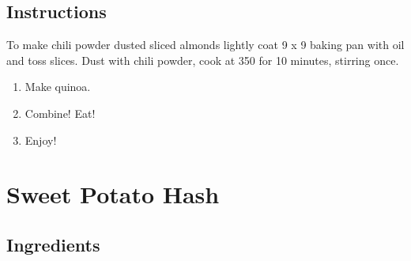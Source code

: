 \documentclass[ansiapaper,10pt,english]{sphinxmanual}
\begin{document}
\section{Instructions}
\label{\detokenize{SA_Quinoa_Salad:instructions}}
To make chili powder dusted sliced almonds lightly coat 9 x 9 baking pan with oil and toss slices.  Dust with chili powder, cook at 350 for 10 minutes, stirring once.
\begin{enumerate}
\item {} 
Make quinoa.

\item {} 
Combine! Eat!

\item {} 
Enjoy!

\end{enumerate}


\chapter{Sweet Potato Hash}
\label{\detokenize{SPH:sweet-potato-hash}}\label{\detokenize{SPH::doc}}

\section{Ingredients}
\label{\detokenize{SPH:ingredients}}
%
\begin{sphinxVerbatim}[commandchars=\\\{\}]
  

   

 

  

    

      

  

  

 
\end{sphinxVerbatim}
\end{document}
